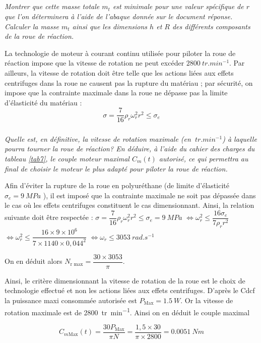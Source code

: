 \else
\fi


  
  
\subparagraph{\label{q_17}}\textit{Montrer que cette masse totale $m_{t}$ est minimale pour
  une valeur spécifique de $r$ que l'on déterminera à l'aide de l'abaque donnée sur le document réponse. Calculer la masse
 $ m_{t}$ ainsi que les dimensions $h$ et $R$ des différents composants de la roue de réaction.}

\ifprof
\begin{corrige}

\end{corrige}
\else
\fi

\ifprof
\else
La technologie de moteur à courant continu utilisée pour piloter la roue
de réaction impose que la vitesse de rotation ne peut excéder $\SI{2800}{
tr.min^{-1}}$. Par ailleurs, la vitesse de rotation doit
être telle que les actions liées aux effets centrifuges dans la roue ne
causent pas la rupture du matériau ; par sécurité, on impose que la
contrainte maximale dans la roue ne dépasse pas la limite d'élasticité
du matériau :
$$
\sigma=\dfrac{7}{16}\rho_r\omega_r^2 r^2\leq \sigma_e
$$
\fi


\subparagraph{\label{q_18}}\textit{Quelle est, en définitive, la vitesse de rotation maximale (en
  $\SI{}{tr.min^{-1}}$) à laquelle pourra tourner la roue de
  réaction? En déduire, à l'aide du cahier des charges du tableau \ref{tab7},
  le couple moteur maximal $C_m(t)$ autorisé, ce qui permettra au final de
  choisir le moteur le plus adapté pour piloter la roue de réaction.}
\ifprof
\begin{corrige}

Afin d’éviter la rupture de la roue en polyuréthane (de limite d’élasticité $\sigma_e = \SI{9}{MPa}$ ), il est
imposé que la contrainte maximale ne soit pas dépassée dans le cas où les effets centrifuges
constituent le cas dimensionnant.
Ainsi, la relation suivante doit être respectée :
$\sigma = \dfrac{7}{16}\rho_r \omega_r^2r^2 \leq \sigma_e =\SI{9}{MPa}$ 
$\Longleftrightarrow \omega_r^2 \leq \dfrac{16 \sigma_e}{7\rho_r r^2}$
$\Longleftrightarrow \omega_r^2 \leq \dfrac{16\times 9\times 10^{6}}{7\times 1140\times 0,044^2}$
$\Longleftrightarrow \omega_r \leq \SI{3053}{rad.s^{-1}}$


On en déduit alors $N_{\text{r max}}=\dfrac{30\times 3053}{\pi}$.

Ainsi, le critère dimensionnant la vitesse de rotation de la roue est le choix de technologie
effectué et non les actions liées aux effets centrifuges.
D’après le Cdcf la puissance maxi consommée autorisée est $P_{\text{Max}}=\SI{1,5}{W}$. Or la vitesse de
rotation maximale est de \SI{2800}{tr.min^{-1}}. Ainsi on en déduit le couple maximal

$$
C_{m\text{Max}}(t)=\dfrac{30 P_{\text{Max}}}{\pi N} = \dfrac{1,5\times 30}{\pi \times 2800} = \SI{0,0051}{Nm}
$$

\end{corrige}
\else
\fi


